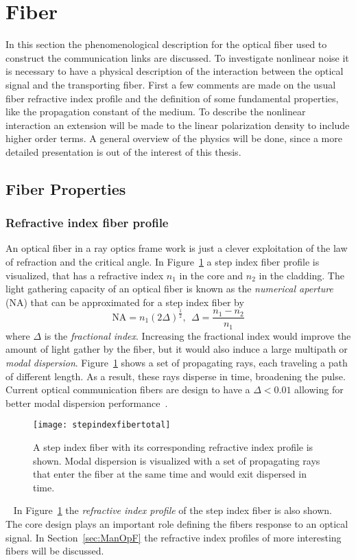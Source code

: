 \section{Fiber}
In this section the phenomenological description for the optical fiber used to construct the communication links are discussed. To investigate nonlinear noise it is necessary to have a physical description of the interaction between the optical signal and the transporting fiber. First a few comments are made on the usual fiber refractive index profile and the definition of some fundamental properties, like the propagation constant of the medium. To describe the nonlinear interaction an extension will be made to the linear polarization density to include higher order terms. A general overview of the physics will be done, since a more detailed presentation is out of the interest of this thesis. 


\subsection{Fiber Properties}\label{sec:Fiber} 
\subsubsection{Refractive index fiber profile}

An optical fiber in a ray optics frame work is just a clever exploitation of the law of refraction and the critical angle.  In Figure~\ref{fig:FiberProf} a step index fiber profile is visualized, that has a refractive index $n_1$ in the core and $n_2$ in the cladding. The light gathering capacity of an optical fiber is known as the \emph{numerical aperture} (NA) that can be approximated for a step index fiber by 
\begin{equation}
\text{NA}=n_1(2\Delta)^\frac{1}{2}, \ \ \Delta=\frac{n_1-n_2}{n_1}
\end{equation}
where $\Delta$ is the \emph{fractional index}. Increasing the fractional index would improve the amount of light gather by the fiber, but it would also induce a large multipath or \emph{modal dispersion}. Figure~\ref{fig:FiberProf} shows a set of propagating rays, each traveling a path of different length. As a result, these rays disperse in time, broadening the pulse. Current optical communication fibers are design to have a $\Delta < 0.01$  allowing for better modal dispersion performance~\cite{FiberAgrawal}.  
\begin{figure}[H]
\center
\texttt{[image: stepindexfibertotal]}
\caption{A step index fiber with its corresponding refractive index profile is shown. Modal dispersion is visualized with a set of propagating rays that enter the fiber at the same time and would exit dispersed in time.  }
\label{fig:FiberProf}
\end{figure}
~
In Figure~\ref{fig:FiberProf} the \textit{refractive index profile} of the step index fiber is also shown. The core design plays an important role defining the fibers response to an optical signal. In Section~\ref{sec:ManOpF} the refractive index profiles of more interesting fibers will be discussed. 



